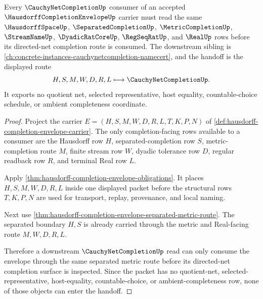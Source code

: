 \begin{theorem}
\label{thm:hausdorff-completion-envelope-forward-link}
Every $\CauchyNetCompletionUp$ consumer of an accepted $\HausdorffCompletionEnvelopeUp$ carrier must read the same $\HausdorffSpaceUp$, $\SeparatedCompletionUp$, $\MetricCompletionUp$, $\StreamNameUp$, $\DyadicRatCoreUp$, $\RegSeqRatUp$, and $\RealUp$ rows before its directed-net completion route is consumed. The downstream sibling is \autoref{ch:concrete-instances-cauchynetcompletion-namecert}, and the handoff is the displayed route
$$
H,S,M,W,D,R,L \longmapsto \CauchyNetCompletionUp .
$$
It exports no quotient net, selected representative, host equality, countable-choice schedule, or ambient completeness coordinate.
\end{theorem}
\begin{proof}
Project the carrier $E=(H,S,M,W,D,R,L,T,K,P,N)$ of \autoref{def:hausdorff-completion-envelope-carrier}. The only completion-facing rows available to a consumer are the Hausdorff row $H$, separated-completion row $S$, metric-completion route $M$, finite stream row $W$, dyadic tolerance row $D$, regular readback row $R$, and terminal Real row $L$.

Apply \autoref{thm:hausdorff-completion-envelope-obligations}. It places $H,S,M,W,D,R,L$ inside one displayed packet before the structural rows $T,K,P,N$ are used for transport, replay, provenance, and local naming.

Next use \autoref{thm:hausdorff-completion-envelope-separated-metric-route}. The separated boundary $H,S$ is already carried through the metric and Real-facing route $M,W,D,R,L$.

Therefore a downstream $\CauchyNetCompletionUp$ read can only consume the envelope through the same separated metric route before its directed-net completion surface is inspected. Since the packet has no quotient-net, selected-representative, host-equality, countable-choice, or ambient-completeness row, none of those objects can enter the handoff.
\end{proof}

